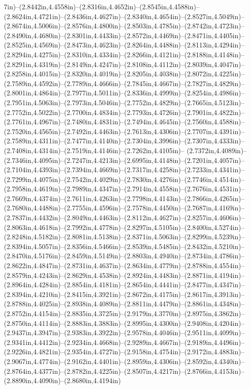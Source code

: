 7in)--(2.8442in,4.4558in)--(2.8316in,4.4652in)--(2.8545in,4.4588in)--(2.8624in,4.4721in)--(2.8436in,4.4627in)--(2.8340in,4.4654in)--(2.8527in,4.5049in)--(2.8674in,4.5006in)--(2.8576in,4.4800in)--(2.8503in,4.4785in)--(2.8742in,4.4723in)--(2.8490in,4.4680in)--(2.8301in,4.4433in)--(2.8572in,4.4469in)--(2.8471in,4.4405in)--(2.8525in,4.4569in)--(2.8473in,4.4623in)--(2.8264in,4.4488in)--(2.8113in,4.4294in)--(2.8294in,4.4275in)--(2.8310in,4.4334in)--(2.8266in,4.4121in)--(2.8188in,4.4148in)--(2.8291in,4.4319in)--(2.8149in,4.4247in)--(2.8108in,4.4112in)--(2.8039in,4.4047in)--(2.8258in,4.4015in)--(2.8320in,4.4019in)--(2.8205in,4.4038in)--(2.8072in,4.4225in)--(2.7589in,4.4592in)--(2.7789in,4.4666in)--(2.7845in,4.4667in)--(2.7827in,4.4829in)--(2.8001in,4.4864in)--(2.7977in,4.5011in)--(2.8336in,4.4999in)--(2.8254in,4.4986in)--(2.7951in,4.5063in)--(2.7973in,4.5046in)--(2.7752in,4.4829in)--(2.7665in,4.5123in)--(2.7752in,4.5022in)--(2.7700in,4.4834in)--(2.7793in,4.4726in)--(2.7901in,4.4822in)--(2.7761in,4.4967in)--(2.7480in,4.4831in)--(2.7494in,4.4645in)--(2.7560in,4.4588in)--(2.7520in,4.4565in)--(2.7492in,4.4463in)--(2.7613in,4.4306in)--(2.7707in,4.4391in)--(2.7589in,4.4311in)--(2.7477in,4.4140in)--(2.7304in,4.3996in)--(2.7307in,4.4333in)--(2.7408in,4.4314in)--(2.7519in,4.4146in)--(2.7262in,4.4105in)--
(2.7372in,4.4089in)--(2.7346in,4.4095in)--(2.7247in,4.4213in)--(2.6995in,4.4148in)--(2.7201in,4.4057in)--(2.7104in,4.4393in)--(2.7394in,4.4669in)--(2.7317in,4.4258in)--(2.7233in,4.4341in)--(2.7299in,4.4075in)--(2.7542in,4.4029in)--(2.7830in,4.4276in)--(2.7746in,4.4514in)--(2.7958in,4.4619in)--(2.7989in,4.4347in)--(2.7914in,4.4558in)--(2.7676in,4.4531in)--(2.7669in,4.4374in)--(2.7611in,4.4263in)--(2.7798in,4.4143in)--(2.7866in,4.4265in)--(2.7680in,4.4488in)--(2.7755in,4.4596in)--(2.7578in,4.4450in)--(2.7687in,4.4169in)--(2.7837in,4.4432in)--(2.8049in,4.4463in)--(2.8112in,4.4627in)--(2.8257in,4.4606in)--(2.8063in,4.4618in)--(2.7992in,4.4778in)--(2.8297in,4.5105in)--(2.8400in,4.5274in)--(2.8248in,4.5182in)--(2.8081in,4.5138in)--(2.8371in,4.5063in)--(2.8299in,4.5239in)--(2.8394in,4.5057in)--(2.8356in,4.5466in)--(2.8539in,4.5485in)--(2.8432in,4.5210in)--(2.8470in,4.5176in)--(2.8459in,4.5149in)--(2.8803in,4.4940in)--(2.8734in,4.4786in)--(2.8622in,4.4847in)--(2.8731in,4.4637in)--(2.8634in,4.4779in)--(2.8788in,4.4554in)--(2.8579in,4.4243in)--(2.8629in,4.4538in)--(2.8924in,4.4483in)--(2.8871in,4.4194in)--(2.8964in,4.4284in)--(2.8854in,4.4181in)--(2.8654in,4.4441in)--(2.8477in,4.4347in)--(2.8394in,4.4210in)--(2.8415in,4.3921in)--(2.8672in,4.4175in)--(2.8617in,4.3913in)--(2.8788in,4.4025in)--(2.8938in,4.4089in)--(2.8811in,4.4479in)--(2.8861in,4.4348in)--(2.8752in,4.4154in)--(2.8835in,4.3725in)--(2.9179in,4.3770in)--(2.8975in,4.3862in)--(2.8750in,4.4114in)--(2.8883in,4.3883in)--(2.8995in,4.4300in)--(2.9408in,4.4204in)--(2.9437in,4.3947in)--(2.9383in,4.3922in)--(2.9578in,4.4046in)--(2.9511in,4.4099in)--(2.9341in,4.4412in)--(2.9234in,4.4668in)--(2.9289in,4.4667in)--(2.9189in,4.4496in)--(2.9226in,4.4821in)--(2.9354in,4.4727in)--(2.9158in,4.4754in)--(2.9172in,4.4883in)--(2.9067in,4.4774in)--(2.9162in,4.4401in)--(2.8959in,4.4306in)--(2.8592in,4.4340in)--(2.8764in,4.4377in)--(2.8782in,4.4225in)--(2.8507in,4.4217in)--(2.8766in,4.4153in)--(2.8890in,4.4090in)--(2.8680in,4.4194in)

